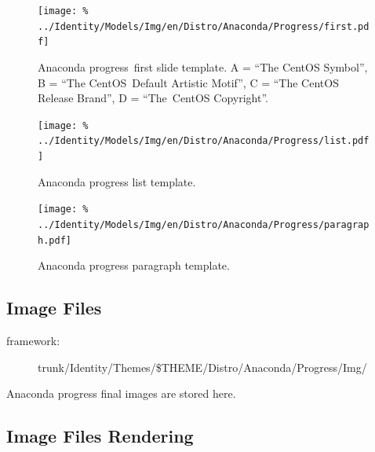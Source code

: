 \begin{figure}[!hbp]
\begin{center}
\texttt{[image: \%
../Identity/Models/Img/en/Distro/Anaconda/Progress/first.pdf]}
\end{center}
\caption[Anaconda progress first slide template]{Anaconda progress\
first slide template. A = ``The CentOS Symbol'', B = ``The CentOS\
Default Artistic Motif'', C = ``The CentOS Release Brand'', D = ``The\
CentOS Copyright''.%
   \label{fig:Distribution:Anaconda:Progress:Identity:Models:First}}
\end{figure}

\begin{figure}[!hbp]
\begin{center}
\texttt{[image: \%
../Identity/Models/Img/en/Distro/Anaconda/Progress/list.pdf]}
\end{center}
\caption{Anaconda progress list template.%
   \label{fig:Distribution:Anaconda:Progress:Identity:Models:Paragraph}}
\end{figure}

\begin{figure}[!hbp]
\begin{center}
\texttt{[image: \%
../Identity/Models/Img/en/Distro/Anaconda/Progress/paragraph.pdf]}
\end{center}
\caption{Anaconda progress paragraph template.%
   \label{fig:Distribution:Anaconda:Progress:Identity:Models:List}}
\end{figure}

 \subsection{Image Files}
\hypertarget{sec:Distribution:Anaconda:Progress:Identity:Image}{}
      \label{sec:Distribution:Anaconda:Progress:Identity:Image}

\begin{description}
\item[framework:] trunk/Identity/Themes/\$THEME/Distro/Anaconda/Progress/Img/
\end{description}

\noindent Anaconda progress final images are stored here.

 \subsection{Image Files Rendering}
\hypertarget{sec:Distribution:Anaconda:Progress:Identity:Image:Rendering}{}
      \label{sec:Distribution:Anaconda:Progress:Identity:Image:Rendering}

